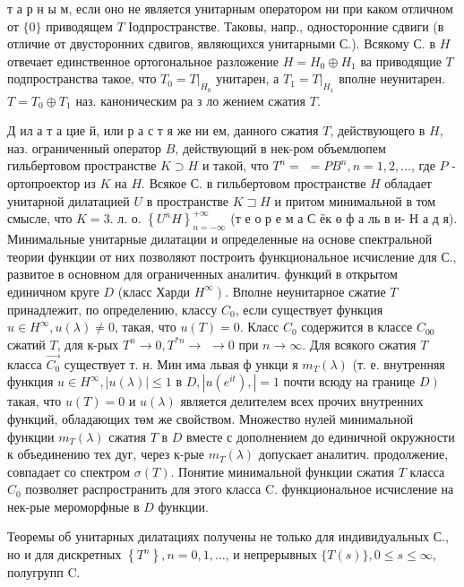 \documentclass[10pt]{article}
\begin{document}
т а р н ы м, если оно не является унитарным оператором ни при каком отличном от $\{0\}$ приводящем $T$ Іодпространстве. Таковы, напр., односторонние сдвиги (в отличие от двусторонних сдвигов, являющихся унитарными С.). Всякому С. в $H$ отвечает единственное ортогональное разложение $H=H_{0} \oplus H_{1}$ ва приводящие $T$ подпространства такое, что $T_{0}=\left.T\right|_{H_{0}}$ унитарен, а $T_{1}=\left.T\right|_{H_{1}}$ вполне неунитарен. $T=T_{0} \oplus T_{1}$ наз. каноническим ра з ло жением сжатия $T$.



Д ил а т а цие й, или р а с т я же ни ем, данного сжатия $T$, действующего в $H$, наз. ограниченный оператор $B$, действующий в нек-ром объемлюпем гильбертовом пространстве $K \supset H$ и такой, что $T^{n}=$ $=P B^{n}, n=1,2, \ldots$, где $P$ - ортопроектор из $K$ на $H$. Всякое С. в гильбертовом пространстве $H$ обладает унитарной дилатацией $U$ в пространстве $K \sqsupset H$ и притом минимальной в том смысле, что $K=3$. л. о. $\left\{U^{n} H\right\}_{n=-\infty}^{+\infty}$ (т е о р е м а С ёк ө ф а ль в и- Н а д я). Минимальные унитарные дилатации и определенные на основе спектральной теории функции от них позволяют построить функциональное исчисление для С., развитое в основном для ограниченных аналитич. функций в открытом единичном круге $D$ (класс Харди $\left.H^{\infty}\right)$. Вполне неунитарное сжатие $T$ принадлежит, по определению, классу $C_{0}$, если существует функция $u \in H^{\infty}, u(\lambda) \neq 0$, такая, что $u(T)=0$. Класс $C_{0}$ содержится в классе $C_{00}$ сжатий $T$, для к-рых $T^{n} \rightarrow 0, T^{* n} \rightarrow$ $\rightarrow 0$ при $n \rightarrow \infty$. Для всякого сжатия $T$ класса $\overrightarrow{C_{0}}$ существует т. н. Мин има львая ф ункци я $m_{T}(\lambda)$ (т. е. внутренняя функция $u \in H^{\infty},|u(\lambda)| \leqslant 1$ в $D,\left|u\left(e^{i t}\right),\right|=1$ почти всюду на границе $\left.D\right)$ такая, что $u(T)=0$ и $u(\lambda)$ является делителем всех прочих внутренних функций, обладающих төм же свойством. Множество нулей минимальной функции $m_{T}(\lambda)$ сжатия $T$ в $D$ вместе с дополнением до единичной окружности к объединению тех дуг, через к-рые $m_{T}(\lambda)$ допускает аналитич. продолжение, совпадает со спектром $\sigma(T)$. Понятие минимальной функции сжатия $T$ класса $C_{0}$ позволяет распространить для этого класса $\mathrm{C}$. функциональное исчисление на нек-рые мероморфные в $D$ функции.



Теоремы об унитарных дилатациях получены не только для индивидуальных С., но и для дискретных $\left\{T^{n}\right\}, n=0,1, \ldots$, и непрерывных $\{T(s)\}, 0 \leqslant s \leqslant \infty$, полугрупп C.
\end{document}
